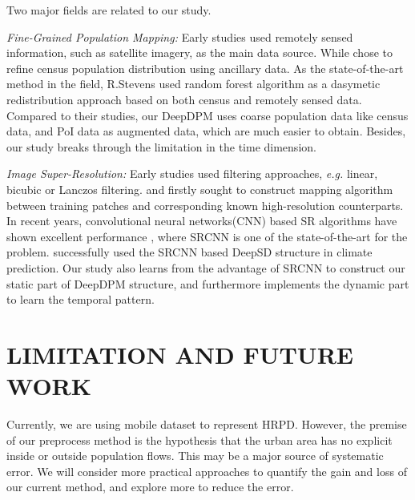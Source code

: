 \documentclass[letterpaper]{article} %
\begin{document}
Two major fields are related to our study. 

\textit{Fine-Grained Population Mapping:} Early studies \cite{anderson1973population,hessami2008automated,sutton2001census} used remotely sensed information, such as satellite imagery, as the main data source. While \citeauthor{azar2010spatial,chen2002approach} chose to refine census population distribution using ancillary data. As the state-of-the-art method in the field, R.Stevens \cite{stevens2015disaggregating} used random forest \cite{liaw2002classification,breiman2001random} algorithm as a dasymetic redistribution approach based on both census and remotely sensed data. Compared to their studies, our DeepDPM uses coarse population data like census data, and PoI data as augmented data, which are much easier to obtain. Besides, our study breaks through the limitation in the time dimension.

\textit{Image Super-Resolution:} Early studies used filtering approaches, \textit{e.g.} linear, bicubic or Lanczos \cite{duchon1979lanczos} filtering. \citeauthor{freeman2002example} and \citeauthor{freeman2000learning} firstly sought to construct mapping algorithm between training patches and corresponding known high-resolution counterparts.
In recent years, convolutional neural networks(CNN) based SR algorithms have shown excellent performance \cite{wang2015deep,Dong2016ImageSU,wang2016end,kim2016deeply}, where
SRCNN \cite{Dong2016ImageSU} is one of the state-of-the-art for the problem. \citeauthor{Vandal2017DeepSD} successfully used the SRCNN based DeepSD structure in climate prediction. Our study also learns from the advantage of SRCNN to construct our static part of DeepDPM structure, and furthermore implements the dynamic part to learn the temporal pattern.


\section{LIMITATION AND FUTURE WORK}
Currently, we are using mobile dataset to represent HRPD. However, the premise of our preprocess method is the hypothesis that the urban area has no explicit inside or outside population flows. This may be a major source of systematic error. We will consider more practical approaches to quantify the gain and loss of our current method, and explore more to reduce the error.
 
\end{document}
